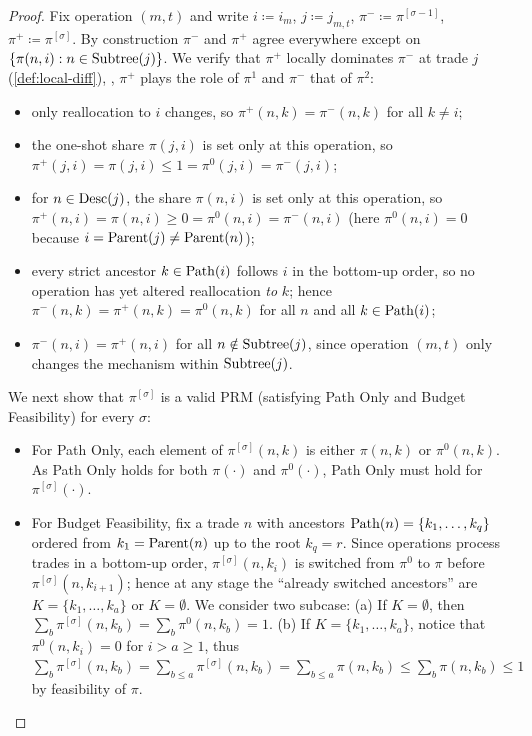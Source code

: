 \begin{proof}
Fix operation $(m,t)$ and write $i \coloneqq i_m$, $j \coloneqq j_{m,t}$, $\pi^- \coloneqq \pi^{[\sigma-1]}$, $\pi^+ \coloneqq \pi^{[\sigma]}$. By construction $\pi^-$ and $\pi^+$ agree everywhere except on $\{\pi(n,i) : n \in \operatorname{Subtree}(j)\}$. We verify that $\pi^+$ locally dominates $\pi^-$ at trade $j$ (\cref{def:local-diff}), \ie, $\pi^+$ plays the role of $\pi^1$ and $\pi^-$ that of $\pi^2$:
\begin{itemize}[left=0em]\itemsep0.1em
\item[(a)] only reallocation to $i$ changes, so $\pi^+(n,k) = \pi^-(n,k)$ for all $k \neq i$;
\item[(b)] the one-shot share $\pi(j,i)$ is set only at this operation, so $\pi^+(j,i) = \pi(j,i) \le 1 = \pi^0(j,i) = \pi^-(j,i)$;
\item[(c)] for $n \in \operatorname{Desc}(j)$, the share $\pi(n,i)$ is set only at this operation, so $\pi^+(n,i) = \pi(n,i) \ge 0 = \pi^0(n,i) = \pi^-(n,i)$ (here $\pi^0(n,i)=0$ because $i = \operatorname{Parent}(j) \neq \operatorname{Parent}(n)$);
\item[(d)] every strict ancestor $k \in \operatorname{Path}(i)$ follows $i$ in the bottom-up order, so no operation has yet altered reallocation \emph{to} $k$; hence $\pi^-(n,k) = \pi^+(n,k) = \pi^0(n,k)$ for all $n$ and all $k \in \operatorname{Path}(i)$;
\item[(e)] $\pi^-(n,i) = \pi^+(n,i)$ for all $n \notin \operatorname{Subtree}(j)$, since operation $(m,t)$ only changes the mechanism within $\operatorname{Subtree}(j)$.
\end{itemize}

We next show that $\pi^{[\sigma]}$ is a valid PRM (satisfying Path Only and Budget Feasibility) for every $\sigma$:
\begin{itemize}[left=0em]
\item[(1)] For Path Only, each element of $\pi^{[\sigma]}(n,k)$ is either $\pi(n,k)$ or $\pi^0(n,k)$. As Path Only holds for both $\pi(\cdot)$ and $\pi^0(\cdot)$, Path Only must hold for $\pi^{[\sigma]}(\cdot)$.
\item[(2)] For Budget Feasibility, fix a trade $n$ with ancestors $\operatorname{Path}(n) = \{k_1, \ldots, k_q\}$ ordered from $k_1 = \operatorname{Parent}(n)$ up to the root $k_q = r$. Since operations process trades in a bottom-up order, $\pi^{[\sigma]}(n,k_i)$ is switched from $\pi^0$ to $\pi$ before $\pi^{[\sigma]}(n,k_{i+1})$; hence at any stage the ``already switched ancestors'' are $K = \{k_1, \ldots, k_a\}$ or $K = \emptyset$.
We consider two subcase: (a) If $K = \emptyset$, then $\sum_b \pi^{[\sigma]}(n,k_b) = \sum_b \pi^0(n,k_b) = 1$. (b) If $K = \{k_1, \ldots, k_a\}$, notice that $\pi^0(n,k_i) = 0$ for $i > a \ge 1$, thus $\sum_b \pi^{[\sigma]}(n,k_b) = \sum_{b \le a} \pi^{[\sigma]}(n,k_b) = \sum_{b \le a} \pi(n,k_b) \le \sum_{b} \pi(n,k_b) \le 1$ by feasibility of $\pi$. 
\end{itemize}


\end{proof}
